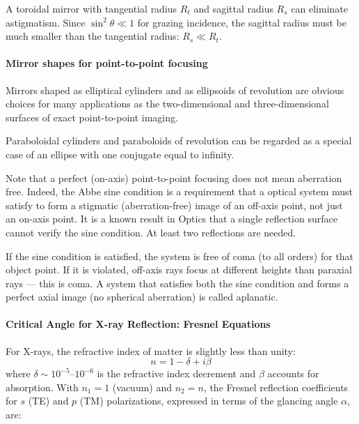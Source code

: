 A toroidal mirror with tangential radius $R_t$ and sagittal radius $R_s$ can
eliminate astigmatism. Since $\sin^2\theta \ll 1$ for grazing incidence, the sagittal radius must be much smaller than the tangential radius: $R_s \ll R_t$.

\paragraph{Mirror shapes for point-to-point focusing}

Mirrors shaped as elliptical cylinders and as ellipsoids of revolution are obvious choices for many applications as the two-dimensional and three-dimensional surfaces of exact point-to-point imaging.

Paraboloidal cylinders and paraboloids of revolution can be regarded as a special case of an ellipse with one conjugate equal to infinity.

Note that a perfect (on-axis) point-to-point focusing does not mean aberration free. Indeed, the Abbe sine condition is a requirement that a optical system must satisfy to form a stigmatic (aberration-free) image of an off-axis point, not just an on-axis point. It is a known result in Optics that a single reflection surface cannot verify the sine condition. At least two reflections are needed. 

If the sine condition is satisfied, the system is free of coma (to all orders) for that object point. 
If it is violated, off-axis rays focus at different heights than paraxial rays — this is coma.
A system that satisfies both the sine condition and forms a perfect axial image (no spherical aberration) is called aplanatic.





\paragraph{Critical Angle for X-ray Reflection: Fresnel Equations}


\noindent
For X-rays, the refractive index of matter is slightly less than unity:
\begin{equation}
    n = 1 - \delta + i\beta
\end{equation}
where $\delta \sim 10^{-5}$--$10^{-6}$ is the refractive index decrement and $\beta$
accounts for absorption. With $n_1 = 1$ (vacuum) and $n_2 = n$, the Fresnel
reflection coefficients for $s$ (TE) and $p$ (TM) polarizations, expressed in
terms of the glancing angle $\alpha$, are:


